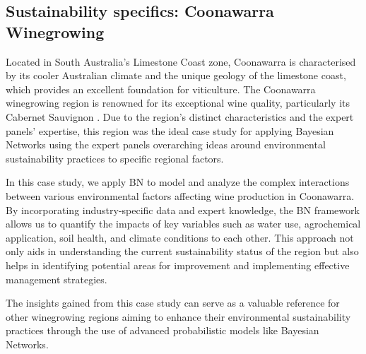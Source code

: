 \subsection{Sustainability specifics: Coonawarra Winegrowing}

Located in South Australia's Limestone Coast zone, Coonawarra is characterised by its cooler Australian climate and the unique geology of the limestone coast, which provides an excellent foundation for viticulture. The Coonawarra winegrowing region is renowned for its exceptional wine quality, particularly its Cabernet Sauvignon \cite{hallidayAustralianWineEncyclopedia2009}. Due to the region's distinct characteristics and the expert panels' expertise, this region was the ideal case study for applying Bayesian Networks using the expert panels overarching ideas around environmental sustainability practices to specific regional factors.

In this case study, we apply BN to model and analyze the complex interactions between various environmental factors affecting wine production in Coonawarra. By incorporating industry-specific data and expert knowledge, the BN framework allows us to quantify the impacts of key variables such as water use, agrochemical application, soil health, and climate conditions to each other. This approach not only aids in understanding the current sustainability status of the region but also helps in identifying potential areas for improvement and implementing effective management strategies.

The insights gained from this case study can serve as a valuable reference for other winegrowing regions aiming to enhance their environmental sustainability practices through the use of advanced probabilistic models like Bayesian Networks.



